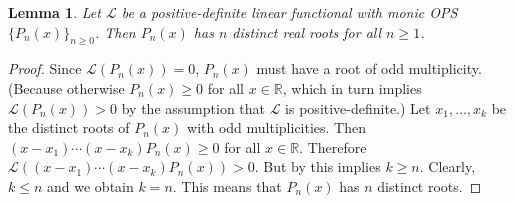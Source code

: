 \documentclass{amsart}
\numberwithin{equation}{section}
\newtheorem{lem}[thm]{Lemma}
\theoremstyle{definition}
\newcommand{\RR}{\mathbb{R}}
\newcommand\LL{\mathcal{L}}
\begin{document}
\begin{lem}\label{lem:real-roots}
  Let \( \LL \) be a positive-definite linear functional with monic
  OPS \( \{ P_n(x) \}_{n\ge 0} \). Then \( P_n(x) \) has \( n \)
  distinct real roots for all \( n\ge1 \).
\end{lem}

\begin{proof}
  Since \( \LL(P_n(x)) = 0 \), \( P_n(x) \) must have a root of odd
  multiplicity. (Because otherwise \( P_n(x)\ge0 \) for all
  \( x\in\RR \), which in turn implies \( \LL(P_n(x))>0 \) by the
  assumption that \( \LL \) is positive-definite.) Let
  \( x_1,\dots,x_k \) be the distinct roots of \( P_n(x) \) with odd
  multiplicities. Then \( (x-x_1) \cdots (x-x_k)P_n(x)\ge0 \) for all
  \( x\in \RR \). Therefore
  \( \LL((x-x_1) \cdots (x-x_k)P_n(x)) > 0 \). But by
   this implies \( k\ge n \). Clearly,
  \( k\le n \) and we obtain \( k=n \). This means that \( P_n(x) \)
  has \( n \) distinct roots.
\end{proof}
\end{document}
